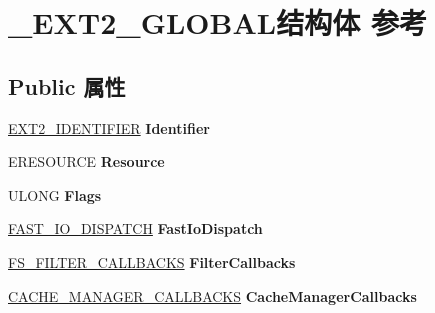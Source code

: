 \hypertarget{struct___e_x_t2___g_l_o_b_a_l}{}\section{\+\_\+\+E\+X\+T2\+\_\+\+G\+L\+O\+B\+A\+L结构体 参考}
\label{struct___e_x_t2___g_l_o_b_a_l}
\subsection*{Public 属性}
\begin{DoxyCompactItemize}
\item 
\mbox{\label{struct___e_x_t2___g_l_o_b_a_l_a68c696ba102c31ae0c73c2e7dd899069}} 
\hyperlink{struct___e_x_t2___i_d_e_n_t_i_f_i_e_r}{E\+X\+T2\+\_\+\+I\+D\+E\+N\+T\+I\+F\+I\+ER} {\bfseries Identifier}
\item 
\mbox{\label{struct___e_x_t2___g_l_o_b_a_l_ac5c4fc51441cf0635e254e2cd3945fdb}} 
E\+R\+E\+S\+O\+U\+R\+CE {\bfseries Resource}
\item 
\mbox{\label{struct___e_x_t2___g_l_o_b_a_l_ad318c33c10f2f2bcd72edb056cdf3257}} 
U\+L\+O\+NG {\bfseries Flags}
\item 
\mbox{\label{struct___e_x_t2___g_l_o_b_a_l_a0ea9c398de2b121279381f24585c1f99}} 
\hyperlink{struct___f_a_s_t___i_o___d_i_s_p_a_t_c_h}{F\+A\+S\+T\+\_\+\+I\+O\+\_\+\+D\+I\+S\+P\+A\+T\+CH} {\bfseries Fast\+Io\+Dispatch}
\item 
\mbox{\label{struct___e_x_t2___g_l_o_b_a_l_a77e314f4b64d9a6fb7c48c40ca6d3fc8}} 
\hyperlink{struct___f_s___f_i_l_t_e_r___c_a_l_l_b_a_c_k_s}{F\+S\+\_\+\+F\+I\+L\+T\+E\+R\+\_\+\+C\+A\+L\+L\+B\+A\+C\+KS} {\bfseries Filter\+Callbacks}
\item 
\mbox{\label{struct___e_x_t2___g_l_o_b_a_l_aee35d072f6b2db72c5e5cd247a110e27}} 
\hyperlink{struct___c_a_c_h_e___m_a_n_a_g_e_r___c_a_l_l_b_a_c_k_s}{C\+A\+C\+H\+E\+\_\+\+M\+A\+N\+A\+G\+E\+R\+\_\+\+C\+A\+L\+L\+B\+A\+C\+KS} {\bfseries Cache\+Manager\+Callbacks}
\item 
\mbox{\label{struct___e_x_t2___g_l_o_b_a_l_a1030ad29839a25e87afc57729bea1863}} 

\end{DoxyCompactItemize}
